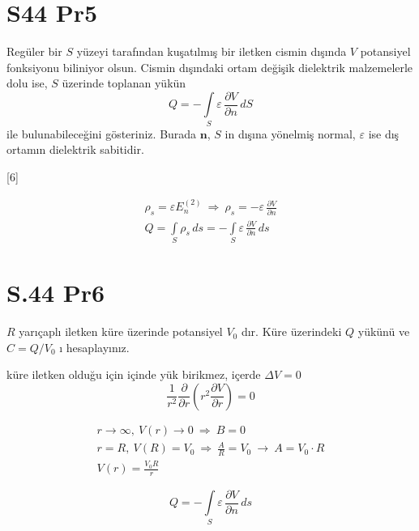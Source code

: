 \documentclass[11pt,a4paper]{article}
\begin{document}
\section{S44 Pr5}
\begin{ornek}[Pr.-5]
Regüler bir $S$ yüzeyi tarafından kuşatılmış bir iletken cismin dışında $V$ potansiyel fonksiyonu biliniyor olsun. Cismin dışındaki ortam değişik dielektrik malzemelerle dolu ise, $S$ üzerinde toplanan yükün
\[ Q=-\int\limits_S\varepsilon\,\frac{\partial V}{\partial n}\,dS \]
ile bulunabileceğini gösteriniz. Burada $\mathbf n$, $S$ in dışına yönelmiş normal, $\varepsilon$ ise dış ortamın dielektrik sabitidir.
\end{ornek}
[6]
\begin{center}
\qquad
\textcolor{kirmizikalem}{}
\end{center}
\begin{gather*}
\rho_s=\varepsilon E_n^{(2)}\ \Rightarrow\ \rho_s=-\varepsilon\,\frac{\partial V}{\partial n}\\
Q=\int\limits_S\rho_s\,ds=-\int\limits_S\varepsilon\,\frac{\partial V}{\partial n}\,ds
\end{gather*}

\section{S.44 Pr6}
\begin{ornek}[Pr.-6]
$R$ yarıçaplı iletken küre üzerinde potansiyel $V_0$ dır. Küre üzerindeki $Q$ yükünü ve $C=Q/V_0$ ı hesaplayınız.
\end{ornek}
\begin{center}
\end{center}
küre iletken olduğu için içinde yük birikmez, içerde $\Delta V=0$
\[ \frac{1}{r^2}\frac{\partial}{\partial r}\left(r^2\frac{\partial V}{\partial r}\right)=0 \]
\begin{center}
\end{center}
\begin{gather*}
r\to\infty,\ V(r)\to0\ \Rightarrow\ B=0\\
r=R,\ V(R)=V_0\ \Rightarrow\ \frac{A}{R}=V_0\ \to\ A=V_0\cdot R\\
V(r)=\frac{V_0R}{r}
\end{gather*}
\begin{center}
\end{center}
\[ Q=-\int\limits_S\varepsilon\,\frac{\partial V}{\partial n}\,ds \]
\end{document}
